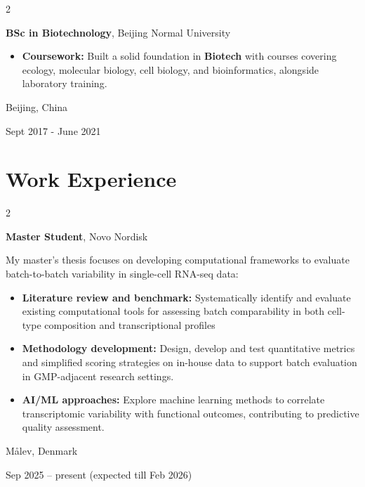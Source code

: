 \documentclass[10pt, letterpaper]{article}
\newenvironment{highlights}{
    \begin{itemize}[
        topsep=0.10 cm,
        parsep=0.10 cm,
        partopsep=0pt,
        itemsep=0pt,
        leftmargin=0.4 cm + 10pt
    ]
}{
    \end{itemize}
} %
\newenvironment{twocolentry}[2][]{
    \onecolentry
    \def\secondColumn{#2}
    \setcolumnwidth{\fill, 4.5 cm}
    \begin{paracol}{2}
}{
    \switchcolumn \raggedleft \secondColumn
    \end{paracol}
    \endonecolentry
} %
\begin{document}
        \vspace{0.3 cm}

\begin{twocolentry}{
    Beijing, China
    
    Sept 2017 - June 2021
}
    \textbf{BSc in Biotechnology}, Beijing Normal University
    \begin{highlights}
        \item \textbf{Coursework:} Built a solid foundation in \textbf{Biotech} with courses covering ecology, molecular biology, cell biology, and bioinformatics, alongside laboratory training.
    \end{highlights}
\end{twocolentry}


    
    \section{Work Experience}

        \begin{twocolentry}{
    Målev, Denmark

    Sep 2025 – present (expected till Feb 2026)
}
    \textbf{Master Student}, Novo Nordisk

    \vspace{0.1cm}
    
     My master’s thesis focuses on developing computational frameworks to evaluate batch-to-batch variability in single-cell RNA-seq data:

    \begin{highlights}
        \item \textbf{Literature review and benchmark:} Systematically identify and evaluate existing computational tools for assessing batch comparability in both cell-type composition and transcriptional profiles

        \vspace{0.1cm}

        \item \textbf{Methodology development:} Design, develop and test quantitative metrics and simplified scoring strategies on in-house data to support batch evaluation in GMP-adjacent research settings.

        \vspace{0.1cm}

        \item \textbf{AI/ML approaches:} Explore machine learning methods to correlate transcriptomic variability with functional outcomes, contributing to predictive quality assessment.

        \vspace{0.1cm}

    \end{highlights}
\end{twocolentry}
\end{document}
